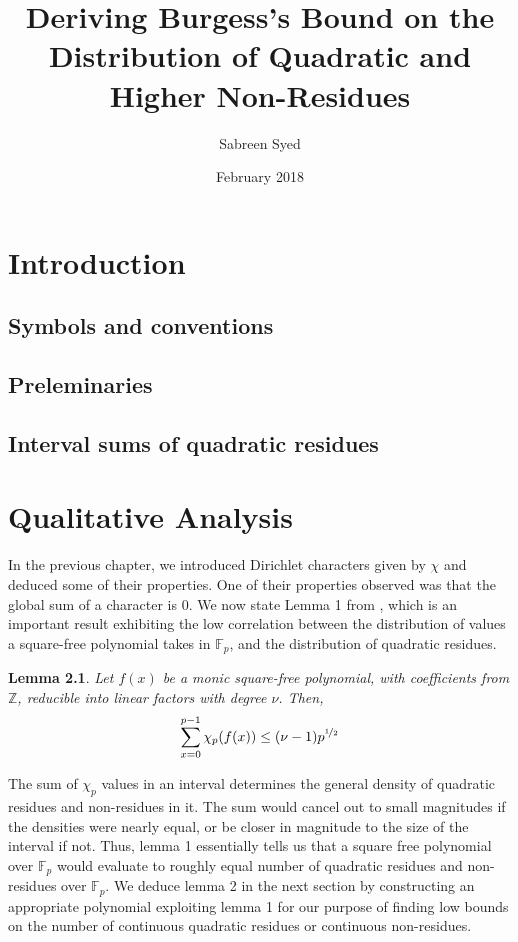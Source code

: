 \documentclass{report}
\title{Deriving Burgess's Bound on the Distribution of Quadratic and Higher Non-Residues}
\author{
  Sabreen Syed\\
  \multicolumn{1}{p{.7\textwidth}}{\centering\emph{Department of Computer Science and Engineering\\
  Indian Institute of Technology Kanpur, India}}}
\date{February 2018}
\newtheorem{lemma}{Lemma}
\begin{document}
\maketitle

\chapter{Introduction}
%
\section{Symbols and conventions}
%
\section{Preleminaries}
%
\section{Interval sums of quadratic residues}
%
%
\chapter{Qualitative Analysis}
In the previous chapter, we introduced Dirichlet characters given by $\chi$ and deduced some of their properties. One of their properties observed was that the global sum of a character is 0.  We now state Lemma 1 from \cite{burgess}, which is an important result exhibiting the low correlation between the distribution of values a square-free polynomial takes in $\mathbb{F}_p$, and the distribution of quadratic residues.
%
\begin{lemma}
Let $f(x)$ be a monic square-free polynomial, with coefficients from $\mathbb{Z}$, reducible into linear factors with degree $\nu$. Then,
$$\sum\limits_{x=0}^{p-1}\chi_p(f(x))\leq (\nu -1)p^{\nicefrac{1}{2}}$$
\end{lemma}
%
The sum of $\chi_p$ values in an interval determines the general density of quadratic residues and non-residues in it. The sum would cancel out to small magnitudes if the densities were nearly equal, or be closer in magnitude to the size of the interval if not. Thus, lemma 1 essentially tells us that a square free polynomial over $\mathbb{F}_p$ would evaluate to roughly equal number of quadratic residues and non-residues over $\mathbb{F}_p$. We deduce lemma 2 in the next section by constructing an appropriate polynomial exploiting lemma 1 for our purpose of finding low bounds on the number of continuous quadratic residues or continuous non-residues.
%
\end{document}
